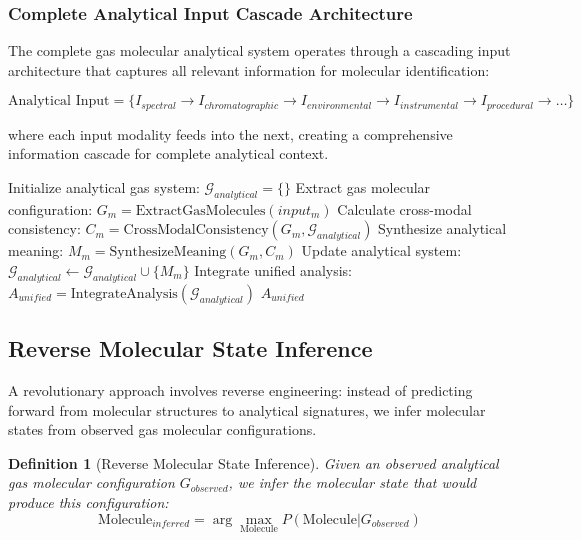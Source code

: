 \documentclass[11pt,a4paper]{article}
\newtheorem{definition}[theorem]{Definition}
\theoremstyle{remark}
\begin{document}
\subsubsection{Complete Analytical Input Cascade Architecture}

The complete gas molecular analytical system operates through a cascading input architecture that captures all relevant information for molecular identification:

$$\text{Analytical Input} = \{I_{spectral} \rightarrow I_{chromatographic} \rightarrow I_{environmental} \rightarrow I_{instrumental} \rightarrow I_{procedural} \rightarrow \ldots\}$$

where each input modality feeds into the next, creating a comprehensive information cascade for complete analytical context.

\begin{algorithm}
\caption{Cross-Modal Analytical Gas Molecular Integration}
\begin{algorithmic}
    \State Initialize analytical gas system: $\mathcal{G}_{analytical} = \{\}$
        \State Extract gas molecular configuration: $G_m = \text{ExtractGasMolecules}(input_m)$
        \State Calculate cross-modal consistency: $C_m = \text{CrossModalConsistency}(G_m, \mathcal{G}_{analytical})$
        \State Synthesize analytical meaning: $M_m = \text{SynthesizeMeaning}(G_m, C_m)$
        \State Update analytical system: $\mathcal{G}_{analytical} \leftarrow \mathcal{G}_{analytical} \cup \{M_m\}$
    \EndFor
    \State Integrate unified analysis: $A_{unified} = \text{IntegrateAnalysis}(\mathcal{G}_{analytical})$
    \State \Return $A_{unified}$
\EndProcedure
\end{algorithmic}
\end{algorithm}

\subsection{Reverse Molecular State Inference}

A revolutionary approach involves reverse engineering: instead of predicting forward from molecular structures to analytical signatures, we infer molecular states from observed gas molecular configurations.

\begin{definition}[Reverse Molecular State Inference]
Given an observed analytical gas molecular configuration $G_{observed}$, we infer the molecular state that would produce this configuration:
$$\text{Molecule}_{inferred} = \arg\max_{\text{Molecule}} P(\text{Molecule} | G_{observed})$$
\end{definition}
\end{document}
